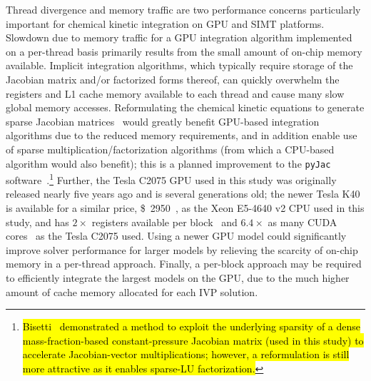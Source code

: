 \documentclass[preprint,review,11pt]{elsarticle}
\DeclareRobustCommand{\hlb}[1]{\sethlcolor{SkyBlue}\hl{#1}}
\begin{document}
Thread divergence and memory traffic are two performance concerns particularly important for chemical kinetic integration on GPU and SIMT platforms.
Slowdown due to memory traffic for a GPU integration algorithm implemented on a per-thread basis primarily results from the small amount of on-chip memory available.
Implicit integration algorithms, which typically require storage of the Jacobian matrix and\slash or factorized forms thereof, can quickly overwhelm the registers and L1 cache memory available to each thread and cause many slow global memory accesses.
Reformulating the chemical kinetic equations to generate sparse Jacobian matrices~\cite{Schwer2002270} would greatly benefit GPU-based integration algorithms due to the reduced memory requirements, and in addition enable use of sparse multiplication\slash factorization algorithms (from which a CPU-based algorithm would also benefit); this is a planned improvement to the \texttt{pyJac} software~\cite{Niemeyer:2016aa,niemeyer_2016_51139}.\footnote{\hlb{Bisetti~\cite{Bisetti:2012jw} demonstrated a method to exploit the underlying sparsity of a dense mass-fraction-based constant-pressure Jacobian matrix (used in this study) to accelerate Jacobian-vector multiplications; however, a reformulation is still more attractive as it enables sparse-LU factorization.}}
Further, the Tesla C2075 GPU used in this study was originally released nearly five years ago and is several generations old; the newer Tesla K40 is available for a similar price, \SI{2950}[\$]{}~\cite{k40_price}, as the Xeon E5-4640 v2 CPU used in this study, and has $2\times$ registers available per block~\cite{NVIDIA:2015aa} and $6.4\times$ as many CUDA cores~\cite{k40_specs} as the Tesla C2075 used.
Using a newer GPU model could significantly improve solver performance for larger models by relieving the scarcity of on-chip memory in a per-thread approach.
Finally, a per-block approach may be required to efficiently integrate the largest models on the GPU, due to the much higher amount of cache memory allocated for each IVP solution.
\end{document}
